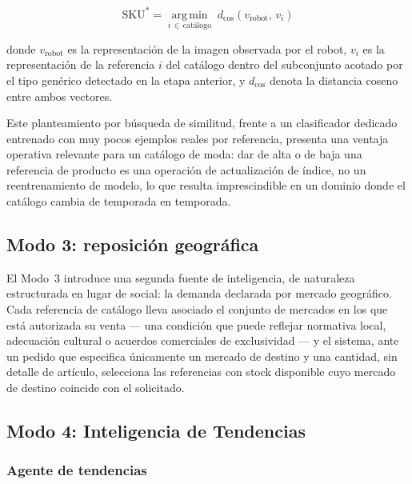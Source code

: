 \documentclass[conference]{IEEEtran}
\begin{document}
\begin{equation}
\text{SKU}^{*} = \operatorname*{arg\,min}_{i \,\in\, \text{catálogo}} \; d_{\cos}\!\left(v_{\text{robot}}, \, v_{i}\right)
\label{eq:sku}
\end{equation}

\noindent donde $v_{\text{robot}}$ es la representación de la imagen
observada por el robot, $v_i$ es la representación de la referencia $i$ del
catálogo dentro del subconjunto acotado por el tipo genérico detectado en la
etapa anterior, y $d_{\cos}$ denota la distancia coseno entre ambos vectores.

Este planteamiento por búsqueda de similitud, frente a un clasificador
dedicado entrenado con muy pocos ejemplos reales por referencia, presenta
una ventaja operativa relevante para un catálogo de moda: dar de alta o de
baja una referencia de producto es una operación de actualización de índice,
no un reentrenamiento de modelo, lo que resulta imprescindible en un dominio
donde el catálogo cambia de temporada en temporada.


\subsection{Modo 3: reposición geográfica}

El Modo~3 introduce una segunda fuente de inteligencia, de naturaleza
estructurada en lugar de social: la demanda declarada por mercado
geográfico. Cada referencia de catálogo lleva asociado el conjunto de
mercados en los que está autorizada su venta --- una condición que puede
reflejar normativa local, adecuación cultural o acuerdos comerciales de
exclusividad --- y el sistema, ante un pedido que especifica únicamente un
mercado de destino y una cantidad, sin detalle de artículo, selecciona las
referencias con stock disponible cuyo mercado de destino coincide con el
solicitado.


\subsection{Modo 4: Inteligencia de Tendencias}
\label{sec:trends}

\subsubsection{Agente de tendencias}
\end{document}
